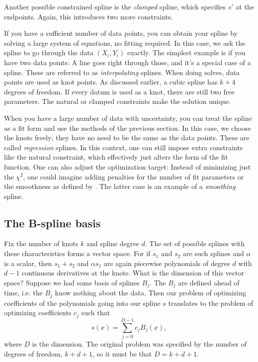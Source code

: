 Another possible constrained spline is the {\it clamped}
 spline, which
specifies $s'$ at the endpoints. Again, this introduces two more constraints.

If you have a sufficient number of data points, you can obtain your spline by
solving a large system of equations, no fitting required. In this case, we ask
the spline to go through the data $(X_i,Y_i)$ exactly. The simplest example
is if you have two data points: A line goes right through those, and it's a
special case of a spline. These are referred to as {\it interpolating}
splines. When doing solves, data points are used as knot
points. As discussed earlier, a cubic spline has $k+4$ degrees of freedom. If
every datum is used as a knot, there are still two free parameters. The natural
or clamped constraints make the solution unique.

When you have a large number of data with uncertainty, you can treat the
spline as a fit form and use the methods of the previous section.
In this case, we choose the knots freely; they have no need to be the same as
the data points. These are called {\it regression}
splines. In this context, one can still impose extra constraints like the
natural constraint, which effectively just alters the form of the fit function. 
One can also adjust the optimization target: Instead of minimizing just the
$\chi^2$, one could imagine adding penalties for the number of fit parameters
or the smoothness as defined by . The latter case is an
example of a {\it smoothing} spline.


\subsection{The B-spline basis}\label{sec:BSpline}

Fix the number of knots $k$ and spline degree $d$. The set of possible splines
with these characteristics forms a vector space. For if $s_1$ and $s_2$ are such 
splines and $\alpha$ is a scalar, then $s_1+s_2$ and
$\alpha s_1$ are again piecewise polynomials of degree $d$ with $d-1$ continuous
derivatives at the knots. What is the dimension of this vector space?
Suppose we had some basis of splines $B_j$. The $B_j$ are defined ahead of time,
i.e. the $B_j$ know nothing about the data. Then our problem of optimizing
coefficients of the polynomials going into our spline $s$ translates to the
problem of optimizing coefficients $c_j$ such that
\begin{equation}\label{eq:s}
  s(x)=\sum_{j=0}^{D-1} c_j B_j(x),
\end{equation}
where $D$ is the dimension.
The original problem was specified by the number of degrees of freedom,
$k+d+1$, so it must be that $D=k+d+1$.

